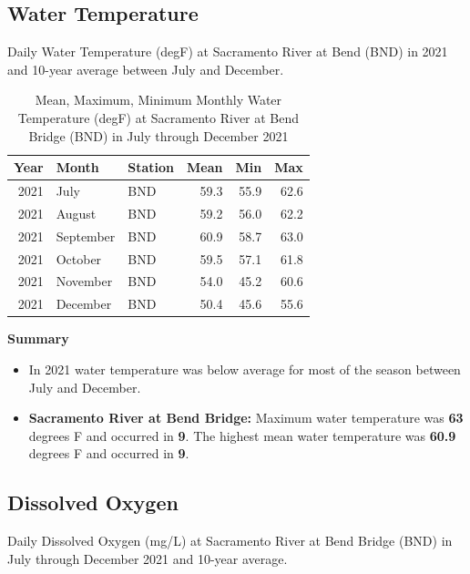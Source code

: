 \documentclass[
]{book}
\providecommand{\tightlist}{%
  \setlength{\itemsep}{0pt}\setlength{\parskip}{0pt}}
\theoremstyle{definition}
\theoremstyle{definition}
\theoremstyle{definition}
\theoremstyle{definition}
\theoremstyle{remark}
\begin{document}
\hypertarget{water-temperature-1}{%
\subsection{Water Temperature}\label{water-temperature-1}}

\label{fig:wtempBND-fig}Daily Water Temperature (degF) at Sacramento River at Bend (BND) in 2021 and 10-year average between July and December.

\begin{table}
\centering
\caption{Mean, Maximum, Minimum Monthly Water Temperature (degF) at Sacramento River at Bend Bridge (BND) in July through December 2021}
\centering
\begin{tabular}[t]{rllrrr}
\hline
Year & Month & Station & Mean & Min & Max\\
\hline
2021 & July & BND & 59.3 & 55.9 & 62.6\\
\hline
2021 & August & BND & 59.2 & 56.0 & 62.2\\
\hline
2021 & September & BND & 60.9 & 58.7 & 63.0\\
\hline
2021 & October & BND & 59.5 & 57.1 & 61.8\\
\hline
2021 & November & BND & 54.0 & 45.2 & 60.6\\
\hline
2021 & December & BND & 50.4 & 45.6 & 55.6\\
\hline
\end{tabular}
\end{table}

\textbf{Summary}

\begin{itemize}
\tightlist
\item
  In 2021 water temperature was below average for most of the season between July and December.
\item
  \textbf{Sacramento River at Bend Bridge:} Maximum water temperature was \textbf{63} degrees F and occurred in \textbf{9}. The highest mean water temperature was \textbf{60.9} degrees F and occurred in \textbf{9}.
\end{itemize}

\hypertarget{dissolved-oxygen}{%
\subsection{Dissolved Oxygen}\label{dissolved-oxygen}}

\label{fig:doBNDjuv-fig}Daily Dissolved Oxygen (mg/L) at Sacramento River at Bend Bridge (BND) in July through December 2021 and 10-year average.
\end{document}
